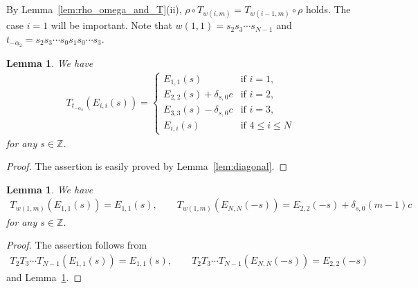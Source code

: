 \documentclass[10pt,a4paper]{amsart}
\newtheorem{lem}[thm]{Lemma}
\theoremstyle{definition}
\numberwithin{equation}{section}
\newcommand{\bbZ}{\mathbb{Z}}
\begin{document}
By Lemma~\ref{lem:rho_omega_and_T}(ii), $\rho \circ T_{w(i,m)} = T_{w(i-1,m)} \circ \rho$ holds. The case $i=1$ will be important. Note that $w(1,1)=s_2 s_3 \cdots s_{N-1}$ and $t_{-\alpha_2} = s_2 s_3 \cdots s_0 s_1 s_0 \cdots s_3$.
\begin{lem}\label{lem:diagonal2}We have
\begin{gather*}
T_{t_{-\alpha_2}}(E_{i,i}(s)) = \begin{cases}
E_{1,1}(s) & \text{if $i=1$}, \\
E_{2,2}(s) + \delta_{s,0}c & \text{if $i=2$}, \\
E_{3,3}(s) - \delta_{s,0}c & \text{if $i=3$}, \\
E_{i,i}(s) & \text{if $4 \leq i \leq N$}
\end{cases}
\end{gather*}
for any $s \in \bbZ$.
\end{lem}
\begin{proof}The assertion is easily proved by Lemma~\ref{lem:diagonal}.
\end{proof}
\begin{lem}\label{lem:i=1_partial}We have
\begin{gather*}
T_{w(1,m)}(E_{1,1}(s)) = E_{1,1}(s),\qquad T_{w(1,m)}(E_{N,N}(-s)) = E_{2,2}(-s) + \delta_{s,0}(m-1)c
\end{gather*}
for any $s \in \bbZ$.
\end{lem}
\begin{proof}The assertion follows from
\begin{gather*}
T_2 T_3 \cdots T_{N-1} (E_{1,1}(s)) = E_{1,1}(s), \qquad T_2 T_3 \cdots T_{N-1} (E_{N,N}(-s)) = E_{2,2}(-s)
\end{gather*}
and Lemma~\ref{lem:diagonal2}.
\end{proof}
\end{document}
